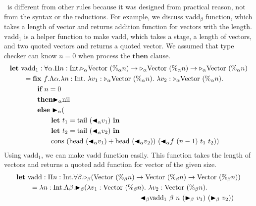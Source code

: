 \QPercent\ is different from other rules because it was designed from practical reason, not from the syntax or the reductions.
For example, we discuss $\text{vadd}_\beta$ function,
which takes a length of vector and returns addition function for vectors with the length.
$\text{vadd}_1$ is a helper function to make $\text{vadd}$, 
which takes a stage, a length of vectors, and two quoted vectors and returns a quoted vector.
We assumed that type checker can know $n=0$ when process the $\textbf{then}$ clause.
\newcommand{\Vpn}{\text{Vector}\ (\%_\alpha n)}
\begin{align*}
	  & \textbf{let}\ \text{vadd}_1 : \F\alpha.\Pi n:\I.\TW_\alpha\Vpn\to\TW_\alpha\Vpn\to\TW_\alpha\Vpn                                \\
	  & \hspace{7mm} = \textbf{fix}\ f.\Lambda\alpha.\lambda n:\I.\ \lambda v_1:\TW_\alpha\Vpn.\ \lambda v_2:\TW_\alpha\Vpn.            \\
	  & \hspace{14mm} \textbf{if}\ n = 0                                                                                                \\
	  & \hspace{14mm} \textbf{then} \TB_\alpha \text{nil}                                                                               \\
	  & \hspace{14mm} \textbf{else}\ \TB_\alpha (                                                                                       \\
	  & \hspace{21mm} \textbf{let}\ t_1 = \text{tail}\ (\TBL_\alpha v_1)\ \textbf{in}                                                   \\
	  & \hspace{21mm} \textbf{let}\ t_2 = \text{tail}\ (\TBL_\alpha v_2)\ \textbf{in}                                                   \\
	  & \hspace{21mm} \text{cons}\ (\text{head}\ (\TBL_\alpha v_1) + \text{head}\ (\TBL_\alpha v_2))\ (\TBL_\alpha f\ (n-1)\ t_1\ t_2)) \\
\end{align*}
Using $\text{vadd}_1$, we can make $\text{vadd}$ function easily.
This function takes the length of vectors and returns a quoted add function for vector of the given size.
\renewcommand{\Vpn}{\text{Vector}\ (\%_\beta n)}
\begin{align*}
	  & \textbf{let}\ \text{vadd}: \Pi n:\I.\F\beta.\TW_\beta(\Vpn\to\Vpn\to\Vpn)                \\ 
	  & \hspace{7mm} = \lambda n:\I.\Lambda\beta.\TB_\beta (\lambda v_1:\Vpn.\ \lambda v_2:\Vpn. \\
	  & \hspace{63mm} \TBL_\beta \text{vadd}_1\ \beta\ n\ (\TB_\beta\ v_1)\ (\TB_\beta\ v_2))    \\
\end{align*}
